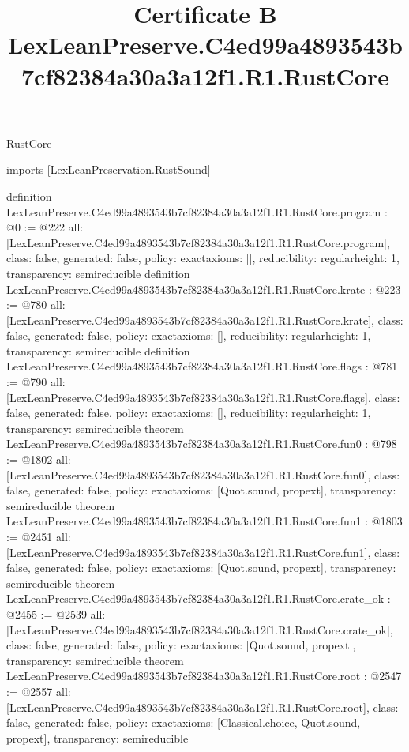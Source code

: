 \begin{lexlean}{RustCore}
\title{Certificate B LexLeanPreserve.C4ed99a4893543b7cf82384a30a3a12f1.R1.RustCore}
\begin{coremodule}
imports [LexLeanPreservation.RustSound]

definition LexLeanPreserve.C4ed99a4893543b7cf82384a30a3a12f1.R1.RustCore.program : @0 := @222 {
  all: [LexLeanPreserve.C4ed99a4893543b7cf82384a30a3a12f1.R1.RustCore.program],
  class: false,
  generated: false,
  policy: exact{axioms: []},
  reducibility: regular{height: 1},
  transparency: semireducible
}
definition LexLeanPreserve.C4ed99a4893543b7cf82384a30a3a12f1.R1.RustCore.krate : @223 := @780 {
  all: [LexLeanPreserve.C4ed99a4893543b7cf82384a30a3a12f1.R1.RustCore.krate],
  class: false,
  generated: false,
  policy: exact{axioms: []},
  reducibility: regular{height: 1},
  transparency: semireducible
}
definition LexLeanPreserve.C4ed99a4893543b7cf82384a30a3a12f1.R1.RustCore.flags : @781 := @790 {
  all: [LexLeanPreserve.C4ed99a4893543b7cf82384a30a3a12f1.R1.RustCore.flags],
  class: false,
  generated: false,
  policy: exact{axioms: []},
  reducibility: regular{height: 1},
  transparency: semireducible
}
theorem LexLeanPreserve.C4ed99a4893543b7cf82384a30a3a12f1.R1.RustCore.fun0 : @798 := @1802 {
  all: [LexLeanPreserve.C4ed99a4893543b7cf82384a30a3a12f1.R1.RustCore.fun0],
  class: false,
  generated: false,
  policy: exact{axioms: [Quot.sound, propext]},
  transparency: semireducible
}
theorem LexLeanPreserve.C4ed99a4893543b7cf82384a30a3a12f1.R1.RustCore.fun1 : @1803 := @2451 {
  all: [LexLeanPreserve.C4ed99a4893543b7cf82384a30a3a12f1.R1.RustCore.fun1],
  class: false,
  generated: false,
  policy: exact{axioms: [Quot.sound, propext]},
  transparency: semireducible
}
theorem LexLeanPreserve.C4ed99a4893543b7cf82384a30a3a12f1.R1.RustCore.crate_ok : @2455 := @2539 {
  all: [LexLeanPreserve.C4ed99a4893543b7cf82384a30a3a12f1.R1.RustCore.crate_ok],
  class: false,
  generated: false,
  policy: exact{axioms: [Quot.sound, propext]},
  transparency: semireducible
}
theorem LexLeanPreserve.C4ed99a4893543b7cf82384a30a3a12f1.R1.RustCore.root : @2547 := @2557 {
  all: [LexLeanPreserve.C4ed99a4893543b7cf82384a30a3a12f1.R1.RustCore.root],
  class: false,
  generated: false,
  policy: exact{axioms: [Classical.choice, Quot.sound, propext]},
  transparency: semireducible
}


\end{coremodule}
\end{lexlean}
